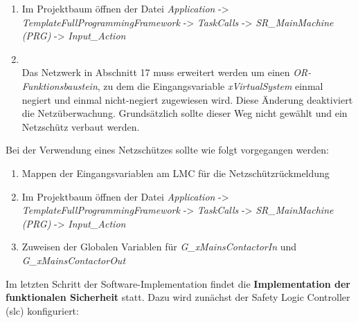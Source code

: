 \documentclass[../../../Bachelorarbeit.tex]{subfiles}
\begin{document}
\begin{enumerate}
    \item Im Projektbaum öffnen der Datei \textit{Application} -> \textit{TemplateFullProgrammingFramework} -> \textit{TaskCalls} -> \textit{SR\_MainMachine (PRG)} -> \textit{Input\_Action}
    \item \begin{minipage}[t]{\linewidth}
        \raggedright
        \label{fig:my-img39}
    \end{minipage}
    \bigskip \\
    Das Netzwerk in Abschnitt 17 muss erweitert werden um einen \textit{OR-Funktionsbaustein}, zu dem die Eingangsvariable \textit{xVirtualSystem} einmal negiert und einmal nicht-negiert zugewiesen wird. Diese Änderung deaktiviert die Netzüberwachung. Grundsätzlich sollte dieser Weg nicht gewählt und ein Netzschütz verbaut werden. 
\end{enumerate}

Bei der Verwendung eines Netzschützes sollte wie folgt vorgegangen werden:

\begin{enumerate}
    \item Mappen der Eingangsvariablen am LMC für die Netzschützrückmeldung
    \item Im Projektbaum öffnen der Datei \textit{Application} -> \textit{TemplateFullProgrammingFramework} -> \textit{TaskCalls} -> \textit{SR\_MainMachine (PRG)} -> \textit{Input\_Action}
    \item Zuweisen der Globalen Variablen für \textit{G\_xMainsContactorIn} und \\ \textit{G\_xMainsContactorOut}
\end{enumerate}

Im letzten Schritt der Software-Implementation findet die \textbf{Implementation der funktionalen Sicherheit} statt. Dazu wird zunächst der Safety Logic Controller (\acs{slc}) konfiguriert:
\end{document}
